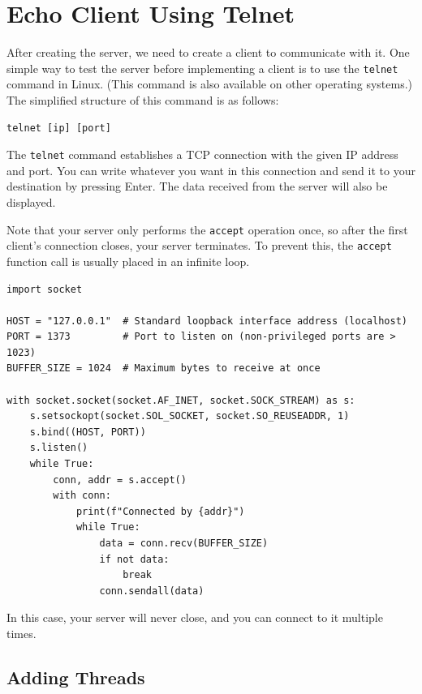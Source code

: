 \documentclass[]{article}
\begin{document}
  \section{Echo Client Using Telnet}

  After creating the server, we need to create a client to communicate with it.
  One simple way to test the server before implementing a client is to use the \texttt{telnet} command in Linux.
  (This command is also available on other operating systems.)
  The simplified structure of this command is as follows:

  \begin{verbatim}
telnet [ip] [port]
  \end{verbatim}

  The \texttt{telnet} command establishes a TCP connection with the given IP address and port.
  You can write whatever you want in this connection and send it to your destination by pressing Enter.
  The data received from the server will also be displayed.

  Note that your server only performs the \texttt{accept} operation once, so after the first client's connection closes, your server terminates.
  To prevent this, the \texttt{accept} function call is usually placed in an infinite loop.

  \begin{verbatim}
import socket

HOST = "127.0.0.1"  # Standard loopback interface address (localhost)
PORT = 1373         # Port to listen on (non-privileged ports are > 1023)
BUFFER_SIZE = 1024  # Maximum bytes to receive at once

with socket.socket(socket.AF_INET, socket.SOCK_STREAM) as s:
    s.setsockopt(socket.SOL_SOCKET, socket.SO_REUSEADDR, 1)
    s.bind((HOST, PORT))
    s.listen()
    while True:
        conn, addr = s.accept()
        with conn:
            print(f"Connected by {addr}")
            while True:
                data = conn.recv(BUFFER_SIZE)
                if not data:
                    break
                conn.sendall(data)
  \end{verbatim}

  In this case, your server will never close, and you can connect to it multiple times.

  \subsection{Adding Threads}
\end{document}
